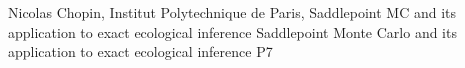 {}	%
{}		%
{Nicolas Chopin, Institut Polytechnique de Paris, Saddlepoint MC and its application to exact ecological inference}	%
{Saddlepoint Monte Carlo and its application to exact ecological inference}		%
{P7}		%
\\\hline
